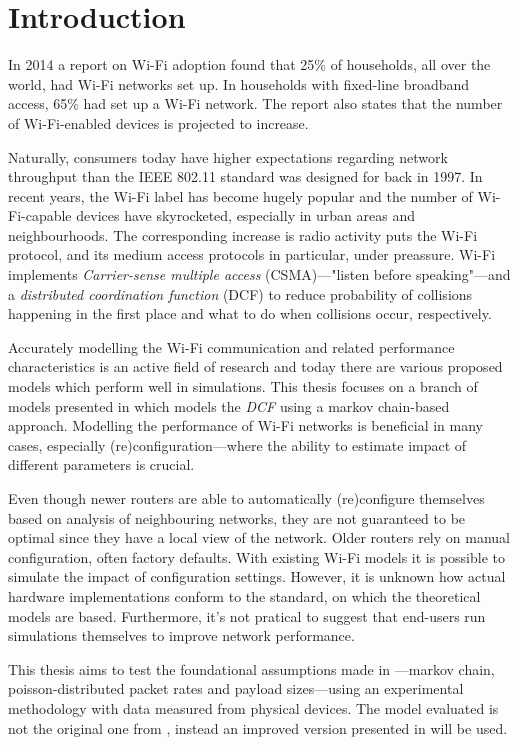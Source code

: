 
\chapter{Introduction}

In 2014 a report on Wi-Fi adoption found that 25\% of households, all over the
world, had Wi-Fi networks set up. In households with fixed-line broadband
access, 65\% had set up a Wi-Fi network\cite{smith}. The report also states that
the number of Wi-Fi-enabled devices is projected to increase.

Naturally, consumers today have higher expectations regarding network
throughput than the IEEE 802.11 standard was designed for back in 1997. In
recent years, the Wi-Fi label has become hugely popular and the number of
Wi-Fi-capable devices have skyrocketed, especially in urban areas and
neighbourhoods. The corresponding increase is radio activity puts the Wi-Fi
protocol, and its medium access protocols in particular, under preassure.
Wi-Fi implements \emph{Carrier-sense multiple access} (CSMA)—"listen before
speaking"—and a \emph{distributed coordination function} (DCF) to reduce
probability of collisions happening in the first place and what to do when
collisions occur, respectively. 

Accurately modelling the Wi-Fi communication and related performance
characteristics is an active field of research and today there are various
proposed models which perform well in simulations. This thesis focuses on a
branch of models presented in \cite{bianchi} which models the \emph{DCF} using
a markov chain-based approach. Modelling the performance of Wi-Fi networks is
beneficial in many cases, especially (re)configuration—where the ability to
estimate impact of different parameters is crucial. 

Even though newer routers are able to automatically (re)configure themselves
based on analysis of neighbouring networks, they are not guaranteed to be
optimal since they have a local view of the network. Older routers rely on
manual configuration, often factory defaults. With existing Wi-Fi models it is
possible to simulate the impact of configuration settings. However, it is
unknown how actual hardware implementations conform to the standard, on which
the theoretical models are based. Furthermore, it's not pratical to suggest
that end-users run simulations themselves to improve network performance.

This thesis aims to test the foundational assumptions made in
\cite{bianchi}—markov chain, poisson-distributed packet rates and payload
sizes—using an experimental methodology with data measured from physical
devices. The model evaluated is not the original one from \cite{bianchi},
instead an improved version presented in \cite{felemban} will be used.

